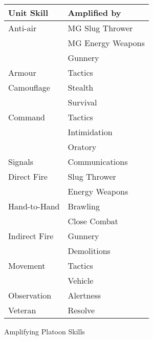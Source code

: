 \begin{wrapfigure}[23]{r}[\sidebarwidth]{\halfbarwidth}
\begin{shadebox}{\halfbarinnerwidth}
\centering
\begin{tabular}{ll}
\toprule
Unit Skill	& Amplified by \\
\midrule
Anti-air	& MG Slug Thrower \\
{}		& MG Energy Weapons \\
{}		& Gunnery \\
Armour		& Tactics \\
Camouflage	& Stealth \\
{}		& Survival \\
Command		& Tactics \\
{}		& Intimidation \\
{}		& Oratory \\
Signals		& Communications \\
Direct Fire	& Slug Thrower \\
{}		& Energy Weapons \\
Hand-to-Hand	& Brawling \\
{}		& Close Combat \\
Indirect Fire	& Gunnery \\
{}		& Demolitions \\
Movement	& Tactics \\
{}		& Vehicle \\
Observation	& Alertness \\
Veteran		& Resolve \\
\bottomrule
\end{tabular}
\end{shadebox}
\caption{Amplifying Platoon Skills}
\label{tab:amplifying-platoon-skills}
\end{wrapfigure}

